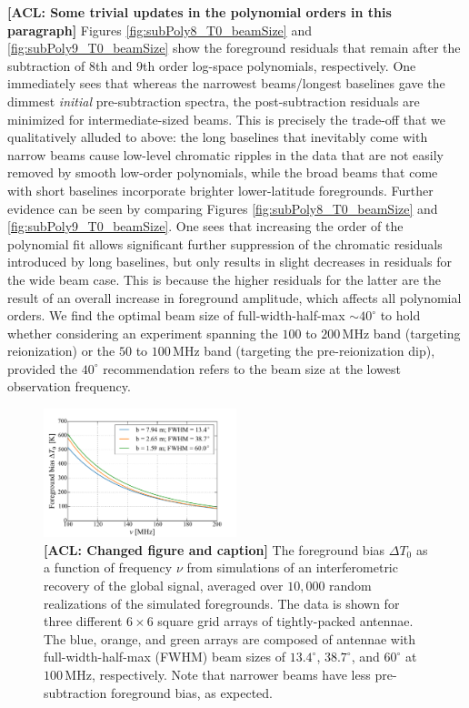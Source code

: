 \documentclass[twocolumn,apj,numberedappendix]{emulateapj}
\newcommand{\acl}[1]{{\color{red} \textbf{[ACL:  #1]}}}
\begin{document}
\acl{Some trivial updates in the polynomial orders in this paragraph} Figures \ref{fig:subPoly8_T0_beamSize} and \ref{fig:subPoly9_T0_beamSize} show the foreground residuals that remain after the subtraction of $8$th and $9$th order log-space polynomials, respectively. One immediately sees that whereas the narrowest beams/longest baselines gave the dimmest \emph{initial} pre-subtraction spectra, the post-subtraction residuals are minimized for intermediate-sized beams. This is precisely the trade-off that we qualitatively alluded to above: the long baselines that inevitably come with narrow beams cause low-level chromatic ripples in the data that are not easily removed by smooth low-order polynomials, while the broad beams that come with short baselines incorporate brighter lower-latitude foregrounds. Further evidence can be seen by comparing Figures \ref{fig:subPoly8_T0_beamSize} and \ref{fig:subPoly9_T0_beamSize}. One sees that increasing the order of the polynomial fit allows significant further suppression of the chromatic residuals introduced by long baselines, but only results in slight decreases in residuals for the wide beam case. This is because the higher residuals for the latter are the result of an overall increase in foreground amplitude, which affects all polynomial orders. We find the optimal beam size of full-width-half-max $ \sim 40^\circ$ to hold whether considering an experiment spanning the $100$ to $200\,\textrm{MHz}$ band (targeting reionization) or the $50$ to $100\,\textrm{MHz}$ band (targeting the pre-reionization dip), provided the $ 40^\circ$ recommendation refers to the beam size at the lowest observation frequency.

\begin{figure}[h]
	\centering
	\includegraphics[width=0.50\textwidth]{figures/unsub_T0_beamSize.pdf}
	\caption{\acl{Changed figure and caption} The foreground bias $\Delta T_0$ as a function of frequency $\nu$ from simulations of an interferometric recovery of the global signal, averaged over $10,000$ random realizations of the simulated foregrounds. The data is shown for three different $6\times6$ square grid arrays of tightly-packed antennae. The blue, orange, and green arrays are composed of antennae with full-width-half-max (FWHM) beam sizes of $13.4^\circ$, $38.7^\circ$, and $60^\circ$ at $100\,\textrm{MHz}$, respectively. Note that narrower beams have less pre-subtraction foreground bias, as expected.}
	\label{fig:unsub_T0_beamSize}
\end{figure}
\end{document}
